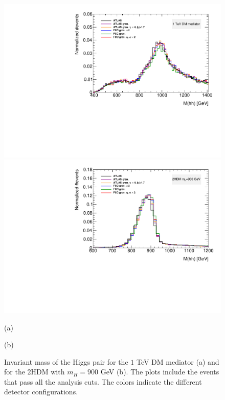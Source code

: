 \begin{figure}
	\centering
	\begin{minipage}[t]{.5\textwidth}
		\centering
		\includegraphics[trim={.55cm 0 0 0},clip,width=\linewidth]{./Figures/MhhX_after.pdf}
	\end{minipage}%
	\begin{minipage}[t]{.5\textwidth}
		\centering
		\includegraphics[trim={0 0 .55cm 0},clip,width=\linewidth]{./Figures/Mhh2HDM_after.pdf}
	\end{minipage}
	
	\begin{minipage}[t]{0.5\textwidth}
		\caption*{(a)}
	\end{minipage}%
	\hfill
	\begin{minipage}[t]{0.5\textwidth}
		\caption*{(b)}
	\end{minipage}
	
	\caption{Invariant mass of the Higgs pair for the $1$ TeV DM mediator (a) and for the 2HDM with $m_H=900$ GeV (b). The plots include the events that pass all the analysis cuts. The colors indicate the different detector configurations.}
	\label{fig:CompGran1}
\end{figure}

